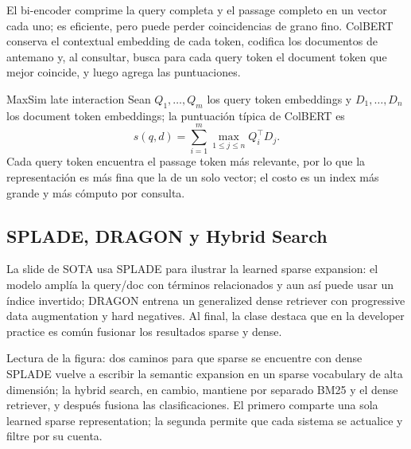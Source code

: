 El bi-encoder comprime la query completa y el passage completo en un vector cada uno; es eficiente, pero puede perder coincidencias de grano fino. ColBERT conserva el contextual embedding de cada token, codifica los documentos de antemano y, al consultar, busca para cada query token el document token que mejor coincide, y luego agrega las puntuaciones.


\begin{importantbox}{MaxSim late interaction}
Sean $Q_1,\ldots,Q_m$ los query token embeddings y $D_1,\ldots,D_n$ los document token embeddings; la puntuación típica de ColBERT es
\[
s(q,d)=\sum_{i=1}^{m}\max_{1\le j\le n} Q_i^\top D_j.
\]
Cada query token encuentra el passage token más relevante, por lo que la representación es más fina que la de un solo vector; el costo es un index más grande y más cómputo por consulta.
\end{importantbox}

\subsection{SPLADE, DRAGON y Hybrid Search}

La slide de SOTA usa SPLADE para ilustrar la learned sparse expansion: el modelo amplía la query/doc con términos relacionados y aun así puede usar un índice invertido; DRAGON entrena un generalized dense retriever con progressive data augmentation y hard negatives. Al final, la clase destaca que en la developer practice es común fusionar los resultados sparse y dense.


\begin{knowledgebox}{Lectura de la figura: dos caminos para que sparse se encuentre con dense}
SPLADE vuelve a escribir la semantic expansion en un sparse vocabulary de alta dimensión; la hybrid search, en cambio, mantiene por separado BM25 y el dense retriever, y después fusiona las clasificaciones. El primero comparte una sola learned sparse representation; la segunda permite que cada sistema se actualice y filtre por su cuenta.
\end{knowledgebox}

